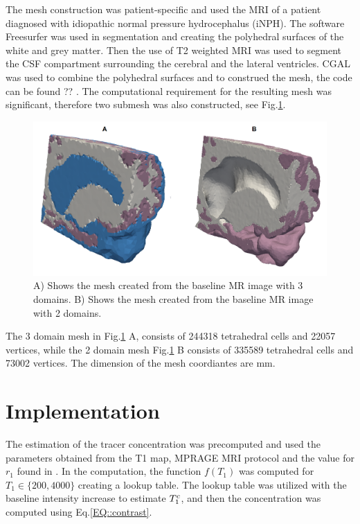 \documentclass[11pt,a4paper]{article}
\begin{document}
The mesh construction was patient-specific and used the MRI of a patient diagnosed with idiopathic normal pressure hydrocephalus (iNPH). The software Freesurfer was used in segmentation and creating the polyhedral surfaces of the white and grey matter. Then the use of T2 weighted MRI \cite{eidevalnes} was used to segment the CSF compartment surrounding the cerebral and the lateral ventricles. CGAL \cite{cgal:rty-m3-18b} was used to combine the polyhedral surfaces and to construed the mesh, the code can be found ?? . The computational requirement for the resulting mesh was significant, therefore two submesh was also constructed, see Fig.\ref{Fig::Mesh}.
\begin{figure}
\centering
\includegraphics[scale=0.2]{mesh.png} 
\caption{A) Shows the mesh created from the baseline MR image with 3 domains. B) Shows the mesh created from the baseline MR image with 2 domains.  }
\label{Fig::Mesh}
\end{figure}
The 3 domain mesh in Fig.\ref{Fig::Mesh} A, consists of 244318 tetrahedral cells and 22057 vertices, while the 2 domain mesh Fig.\ref{Fig::Mesh} B consists of 335589 tetrahedral cells and 73002 vertices. The dimension of the mesh coordiantes are $\mathrm{mm}$.


\section{Implementation}
The estimation of the tracer concentration was precomputed and used the parameters obtained from the T1 map, MPRAGE MRI protocol \cite{eidevalnes} and the value for $r_1$ found in \cite{pmid16230904}. In the computation, the function $f(T_1)$ was computed for $ T_1\in \lbrace 200, 4000 \rbrace$ creating a lookup table. The lookup table was utilized with the baseline intensity increase to estimate $T_1\sp{c}$, and then the concentration was computed using Eq.\ref{EQ::contrast}.  
\end{document}
